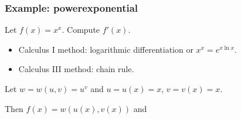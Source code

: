 \begin{frame}
\frametitle{Example: powerexponential}
Let $f(x) = x^x$. Compute $f'(x)$.
\begin{itemize}
\item Calculus I method: logarithmic differentiation or $x^x= e^{x\ln x}$.
\item Calculus III method: chain rule.
\end{itemize}
\pause
Let $w=w(u,v) = u^v$ and $u=u(x) = x$, $v=v(x) = x$.
%
\[~
\]

Then $f(x) = w(u(x),v(x))$ and
%

\end{frame}